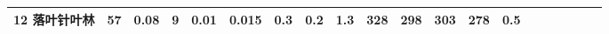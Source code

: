 \begin{sidewaystable}[]
\begin{tabular}{@{}lccccccccccccccccccc@{}}
    12 落叶针叶林       & 57                                                                & 0.08                                                                                                   & 9                                                                                  & 0.01                                                                               & 0.015                                                               & 0.3                                                       & 0.2                                                       & 1.3                                                       & 328                                                             & 298                                                             & 303                                                              & 278                                                               & 0.5                                                          \\ \bottomrule
    \end{tabular}
\end{sidewaystable}

